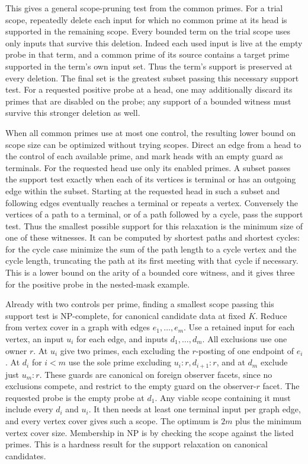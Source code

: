 This gives a general scope-pruning test from the common primes.
For a trial scope, repeatedly delete each input for which no
common prime at its head is supported in the remaining scope.
Every bounded term on the trial scope uses only inputs that
survive this deletion. Indeed each used input is live at the
empty probe in that term, and a common prime of its source
contains a target prime supported in the term's own input
set. Thus the term's support is preserved at every deletion.
The final set is the greatest subset passing this necessary
support test. For a requested positive probe at a head,
one may additionally discard its primes that are disabled
on the probe; any support of a bounded witness must survive
this stronger deletion as well.

When all common primes use at most one control, the resulting
lower bound on scope size can be optimized without trying
scopes. Direct an edge from a head to the control of each
available prime, and mark heads with an empty guard as
terminals. For the requested head use only its enabled primes.
A subset passes the support test exactly when each of its
vertices is terminal or has an outgoing edge within the
subset. Starting at the requested head in such a subset and
following edges eventually reaches a terminal or repeats a
vertex. Conversely the vertices of a path to a terminal, or
of a path followed by a cycle, pass the support test. Thus
the smallest possible support for this relaxation is the
minimum size of one of these witnesses. It can be computed
by shortest paths and shortest cycles: for the cycle case
minimize the sum of the path length to a cycle vertex and
the cycle length, truncating the path at its first meeting
with that cycle if necessary. This is a lower bound on the
arity of a bounded core witness, and it gives three for the
positive probe in the nested-mask example.

Already with two controls per prime, finding a smallest
scope passing this support test is NP-complete, for canonical
candidate data at fixed $K$. Reduce from vertex cover in a
graph with edges $e_1,\ldots,e_m$. Use a retained input for
each vertex, an input $u_i$ for each edge, and inputs
$d_1,\ldots,d_m$. All exclusions use one owner $r$. At $u_i$
give two primes, each excluding the $r$-posting of one
endpoint of $e_i$. At $d_i$ for $i<m$ use the sole prime
excluding $u_i:r,d_{i+1}:r$, and at $d_m$ exclude just
$u_m:r$. These guards are canonical on foreign observer
facets, since no exclusions compete, and restrict to the
empty guard on the observer-$r$ facet. The requested probe
is the empty probe at $d_1$. Any viable scope containing it
must include every $d_i$ and $u_i$. It then needs at least
one terminal input per graph edge, and every vertex cover
gives such a scope. The optimum is $2m$ plus the minimum
vertex cover size. Membership in NP is by checking the
scope against the listed primes. This is a hardness result
for the support relaxation on canonical candidates.

